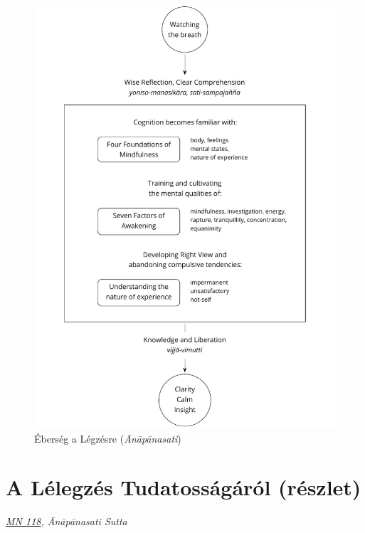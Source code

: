 \clearpage
\figurepagelayout

\begin{figure}[h]
\caption{Éberség a Légzésre (\emph{Ānāpānasati})}\label{fig-mindfulness-of-breathing}
\bigskip
\includegraphics[width=\linewidth]{./manuscript/tex/diagrams/mindfulness-of-breathing.pdf}
\end{figure}

\clearpage
\normalpagelayout

\section{A Lélegzés Tudatosságáról (részlet)}

{\centering
\emph{\href{https://a-buddha-ujja.hu/mn-118/hu/farkas-pal}{MN 118}, Ānāpānasati Sutta}
\par}

